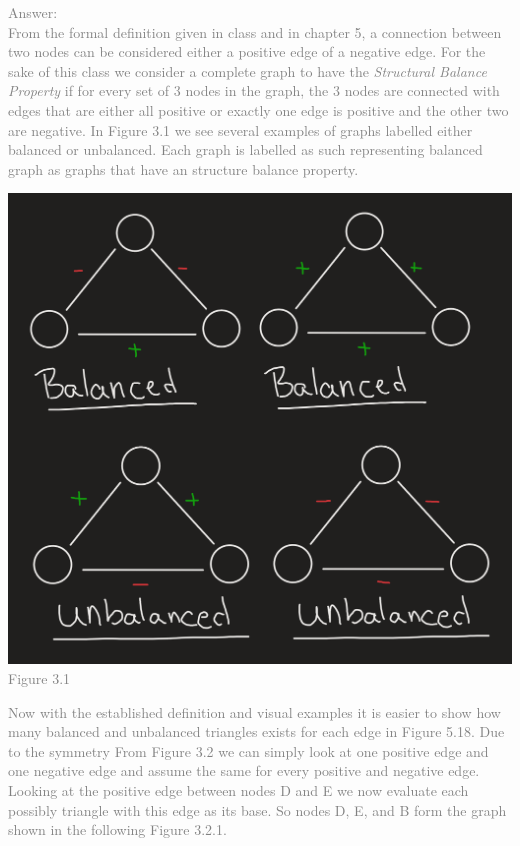 \documentclass[11pt]{article}
\begin{document}
\begin{enumerate}
\textcolor{gray}{
Answer:\\
From the formal definition given in class and in chapter 5, a connection between two nodes can be considered either a positive edge of a negative edge.  For the sake of this class we consider a complete graph to have the \textit{Structural Balance Property} if for every set of 3 nodes in the graph, the 3 nodes are connected with edges that are either all positive or exactly one edge is positive and the other two are negative. In Figure 3.1 we see several examples of graphs labelled either balanced or unbalanced.  Each graph is labelled as such representing balanced graph as graphs that have an structure balance property.\\
\begin{center}
	\includegraphics[scale=0.5]{example_ballanced_and_not_ballanced_graph}\\
	Figure 3.1\\
\end{center}
Now with the established definition and visual examples it is easier to show how many balanced and unbalanced triangles exists for each edge in Figure 5.18. Due to the symmetry From Figure 3.2 we can simply look at one positive edge and one negative edge and assume the same for every positive and negative edge. Looking at the positive edge between nodes D and E we now evaluate each possibly triangle with this edge as its base.  So nodes D, E, and B  form the graph shown in the following Figure 3.2.1.\\
}
\end{enumerate}
\end{document}
